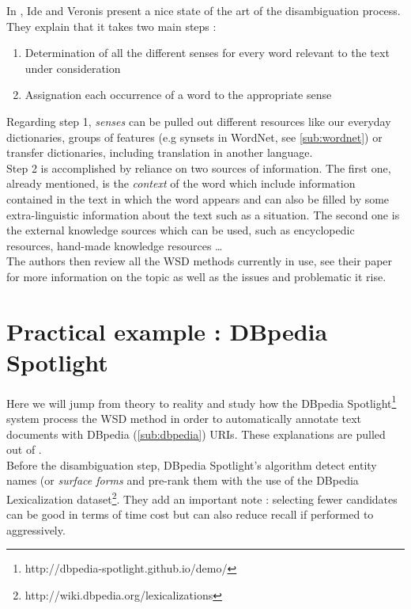 In \cite{ide1998introduction}, Ide and Veronis present a nice state of the art of the disambiguation process. They explain that it takes two main steps :
\begin{enumerate}
 	\item Determination of all the different senses for every word relevant to the text under consideration
 	\item Assignation each occurrence of a word to the appropriate sense
\end{enumerate} 
Regarding step 1, \textit{senses} can be pulled out different resources like our everyday dictionaries, groups of features (e.g synsets in WordNet, see \ref{sub:wordnet}) or transfer dictionaries, including translation in another language.\\
Step 2 is accomplished by reliance on two sources of information. The first one, already mentioned, is the \textit{context} of the word which include information contained in the text in which the word appears and can also be filled by some extra-linguistic information about the text such as a situation. The second one is the external knowledge sources which can be used, such as encyclopedic resources, hand-made knowledge resources \dots\\
The authors then review all the WSD methods currently in use, see their paper for more information on the topic as well as the issues and problematic it rise.

\section{Practical example : DBpedia Spotlight} %
\label{sec:dbpedia_spotlight}
Here we will jump from theory to reality and study how the DBpedia Spotlight\footnote{http://dbpedia-spotlight.github.io/demo/} system process the WSD method in order to automatically annotate text documents with DBpedia (\ref{sub:dbpedia}) URIs. These explanations are pulled out of \cite{mendes2011dbpedia}.\\

Before the disambiguation step, DBpedia Spotlight's algorithm detect entity names (or \textit{surface forms} and pre-rank them with the use of the DBpedia Lexicalization dataset\footnote{http://wiki.dbpedia.org/lexicalizations}. They add an important note : selecting fewer candidates can be good in terms of time cost but can also reduce recall if performed to aggressively.\\

